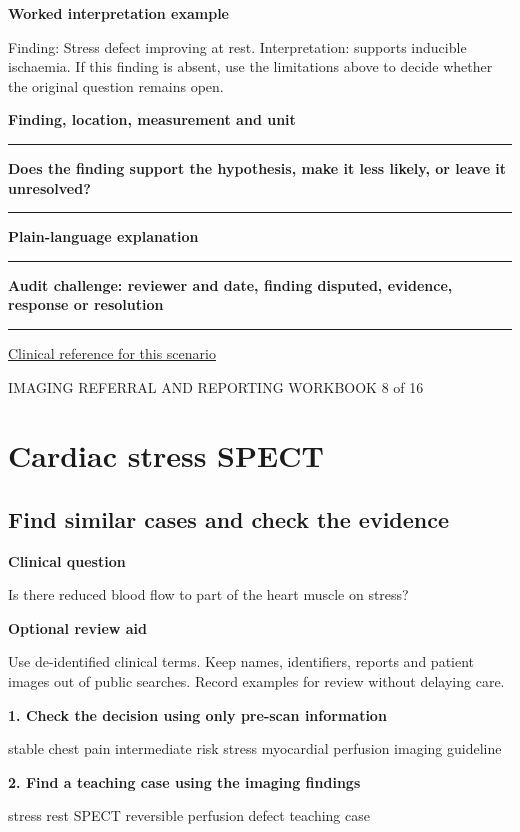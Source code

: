 \documentclass[11pt,a4paper]{article}
\newcommand{\record}[1]{\textbf{#1}\par\vspace{0.55\baselineskip}\hrule\vspace{0.35\baselineskip}}
\begin{document}
\textbf{Worked interpretation example}\par Finding: Stress defect improving at rest. Interpretation: supports inducible ischaemia. If this finding is absent, use the limitations above to decide whether the original question remains open.\par

\record{Finding, location, measurement and unit}

\record{Does the finding support the hypothesis, make it less likely, or leave it unresolved?}

\record{Plain-language explanation}

\record{Audit challenge: reviewer and date, finding disputed, evidence, response or resolution}

\small\href{https://www.jacc.org/doi/10.1016/j.jacc.2021.07.053}{Clinical reference for this scenario}

\normalsize

\newpage

{\small IMAGING REFERRAL AND REPORTING WORKBOOK \hfill 8 of 16}

\section*{Cardiac stress SPECT}

\subsection*{Find similar cases and check the evidence}

\textbf{Clinical question}\par Is there reduced blood flow to part of the heart muscle on stress?\par

\textbf{Optional review aid}\par Use de-identified clinical terms. Keep names, identifiers, reports and patient images out of public searches. Record examples for review without delaying care.\par

\textbf{1. Check the decision using only pre-scan information}\par stable chest pain intermediate risk stress myocardial perfusion imaging guideline\par

\textbf{2. Find a teaching case using the imaging findings}\par stress rest SPECT reversible perfusion defect teaching case\par
\end{document}
